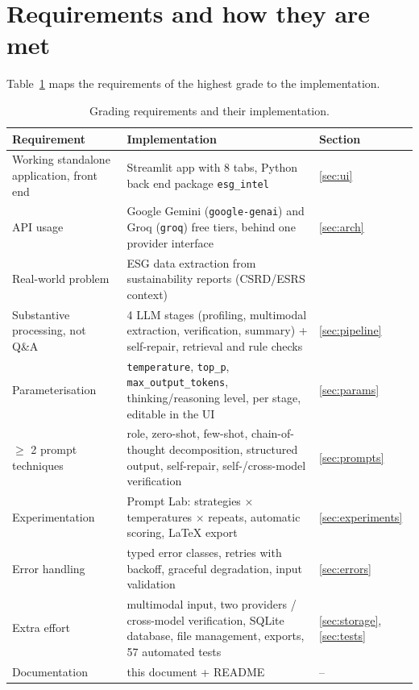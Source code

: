 \documentclass[11pt,a4paper]{article}
\newcommand{\code}[1]{\texttt{\small #1}}
\begin{document}
\section{Requirements and how they are met}
Table~\ref{tab:rubric} maps the requirements of the highest grade to the implementation.

\begin{table}[H]
\centering\small
\begin{tabularx}{\linewidth}{@{}>{\raggedright\arraybackslash}p{4.3cm}X>{\raggedright\arraybackslash}p{1.5cm}@{}}
\toprule
\textbf{Requirement} & \textbf{Implementation} & \textbf{Section}\\\midrule
Working standalone application, front end & Streamlit app with 8 tabs, Python back end package \code{esg\_intel} & \ref{sec:ui}\\
API usage & Google Gemini (\code{google-genai}) and Groq (\code{groq}) free tiers, behind one provider interface & \ref{sec:arch}\\
Real-world problem & ESG data extraction from sustainability reports (CSRD/ESRS context) & 1\\
Substantive processing, not Q\&A & 4 LLM stages (profiling, multimodal extraction, verification, summary) + self-repair, retrieval and rule checks & \ref{sec:pipeline}\\
Parameterisation & \code{temperature}, \code{top\_p}, \code{max\_output\_tokens}, thinking/reasoning level, per stage, editable in the UI & \ref{sec:params}\\
$\geq$ 2 prompt techniques & role, zero-shot, few-shot, chain-of-thought decomposition, structured output, self-repair, self-/cross-model verification & \ref{sec:prompts}\\
Experimentation & Prompt Lab: strategies $\times$ temperatures $\times$ repeats, automatic scoring, LaTeX export & \ref{sec:experiments}\\
Error handling & typed error classes, retries with backoff, graceful degradation, input validation & \ref{sec:errors}\\
Extra effort & multimodal input, two providers / cross-model verification, SQLite database, file management, exports, 57 automated tests & \ref{sec:storage}, \ref{sec:tests}\\
Documentation & this document + README & --\\
\bottomrule
\end{tabularx}
\caption{Grading requirements and their implementation.}
\label{tab:rubric}
\end{table}
\end{document}
